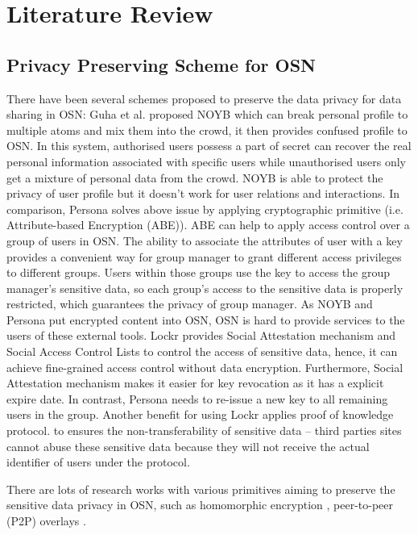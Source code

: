 \chapter{Literature Review}

\section{Privacy Preserving Scheme for OSN}
There have been several schemes proposed to preserve the data privacy for data sharing in OSN: Guha et al. proposed NOYB \cite{guha2008noyb} which can break personal profile to multiple atoms and mix them into the crowd, it then provides confused profile to OSN. In this system, authorised users possess a part of secret can recover the real personal information associated with specific users while unauthorised users only get a mixture of personal data from the crowd. NOYB is able to protect the privacy of user profile but it doesn't work for user relations and interactions. 
In comparison, Persona \cite{baden2009persona} solves above issue by applying cryptographic primitive (i.e. Attribute-based Encryption (ABE)). ABE can help to apply access control over a group of users in OSN. The ability to associate the attributes of user with a key provides a convenient way for group manager to grant different access privileges to different groups. Users within those groups use the key to access the group manager's sensitive data, so each group's access to the sensitive data is properly restricted, which guarantees the privacy of group manager. 
As NOYB and Persona put encrypted content into OSN, OSN is hard to provide services to the users of these external tools. Lockr \cite{tootoonchian2009lockr} provides Social Attestation mechanism and Social Access Control Lists to control the access of sensitive data, hence, it can achieve fine-grained access control without data encryption. Furthermore, Social Attestation mechanism makes it easier for key revocation as it has a explicit expire date. In contrast, Persona needs to re-issue a new key to all remaining users in the group. Another benefit for using Lockr applies proof of knowledge protocol.
 to ensures the non-transferability of sensitive data -- third parties sites cannot abuse these sensitive data because they will not receive the actual identifier of users under the protocol.
 
There are lots of research works with various primitives aiming to preserve the sensitive data privacy in OSN, such as homomorphic encryption \cite{domingo2008privacy}, peer-to-peer (P2P) overlays \cite{cutillo2009safebook}. 

